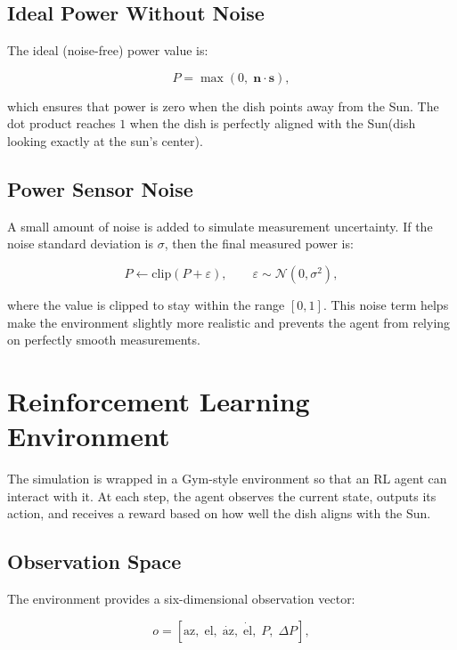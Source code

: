 \documentclass[11pt,a4paper]{article}
\begin{document}
\subsection{Ideal Power Without Noise}

The ideal (noise-free) power value is:

\begin{equation}
\label{eq:power_dot}
P = \max\left(0,\; \mathbf{n} \cdot \mathbf{s} \right),
\end{equation}

which ensures that power is zero when the dish points away from the Sun.  
The dot product reaches $1$ when the dish is perfectly aligned with the Sun(dish looking exactly at the sun's center).

\subsection{Power Sensor Noise}

A small amount of noise is added to simulate measurement uncertainty.  
If the noise standard deviation is $\sigma$, then the final measured power is:

\begin{equation}
\label{eq:noise}
P \leftarrow \mathrm{clip}\left( P + \varepsilon \right),
\qquad
\varepsilon \sim \mathcal{N}(0, \sigma^2),
\end{equation}

where the value is clipped to stay within the range $[0, 1]$.  
This noise term helps make the environment slightly more realistic and prevents the agent from relying on perfectly smooth measurements.

\section{Reinforcement Learning Environment}

The simulation is wrapped in a Gym-style environment so that an RL agent can interact with it.  
At each step, the agent observes the current state, outputs its action, and receives a reward based on how well the dish aligns with the Sun.

\subsection{Observation Space}

The environment provides a six-dimensional observation vector:

\begin{equation}
o = 
\left[
\mathrm{az},\;
\mathrm{el},\;
\dot{\mathrm{az}},\;
\dot{\mathrm{el}},\;
P,\;
\Delta P
\right],
\end{equation}
\end{document}
